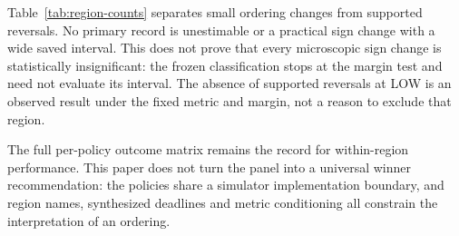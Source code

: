 Table~\ref{tab:region-counts} separates small ordering changes from
supported reversals. No primary record is unestimable or a practical sign
change with a wide saved interval. This does not prove that every
microscopic sign change is statistically insignificant: the frozen
classification stops at the margin test and need not evaluate its interval.
The absence of supported reversals at LOW is an observed result under the
fixed metric and margin, not a reason to exclude that region.

The full per-policy outcome matrix remains the record for within-region
performance. This paper does not turn the panel into a universal winner
recommendation: the policies share a simulator implementation boundary,
and region names, synthesized deadlines and metric conditioning all
constrain the interpretation of an ordering.
